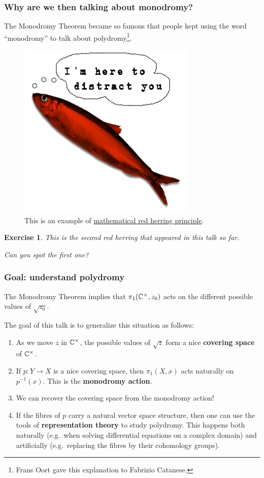 \documentclass[notheorems, hyperref={backref}]{beamer}
\newtheorem{exe}{Exercise}
\begin{document}
\begin{frame}
    \frametitle{Why are we then talking about monodromy?}
    The Monodromy Theorem became so famous that people kept using the word ``monodromy'' to talk about polydromy\footnote{Frans Oort gave this explanation to Fabrizio Catanese.}.
    \pause
    \begin{figure}[htp]
	\centering
	\includegraphics[scale=.3]{pictures/RedHerring.png}
	\caption{This is an example of \href{https://ncatlab.org/nlab/show/red+herring+principle}{mathematical red herring principle}.}
    \end{figure}
    \pause
    \setcounter{exe}{-1}
    \begin{exe}
	This is the second red herring that appeared in this talk so far.

	Can you spot the first one?
    \end{exe}
\end{frame}

\begin{frame}
    \frametitle{Goal: understand polydromy}
    The Monodromy Theorem implies that $\pi_{1}(\mathbb{C}^{\times},z_{0})$ acts on the different possible values of $\sqrt{z_{0}}$.
    \pause

    The goal of this talk is to generalize this situation as follows:
    \pause
    \begin{enumerate}[label=\textbullet]
	\setlength\itemsep{1em}
	\item As we move $z$ in $\mathbb{C}^{\times}$, the possible values of $\sqrt{z}$ form a nice \textbf{covering space} of $\mathbb{C}^{\times}$.
	\pause
	\item If $p\colon Y\to X$ is a nice covering space, then $\pi_{1}(X,x)$ acts naturally on $p^{-1}(x)$.
	    This is the \textbf{monodromy action}.
	\pause
    \item We can recover the covering space from the monodromy action!
	\pause
    \item If the fibres of $p$ carry a natural vector space structure, then one can use the tools of \textbf{representation theory} to study polydromy.
	\pause
	This happens both naturally (e.g.~when solving differential equations on a complex domain) and artificially (e.g.~replacing the fibres by their cohomology groups).
    \end{enumerate}
\end{frame}
\end{document}

